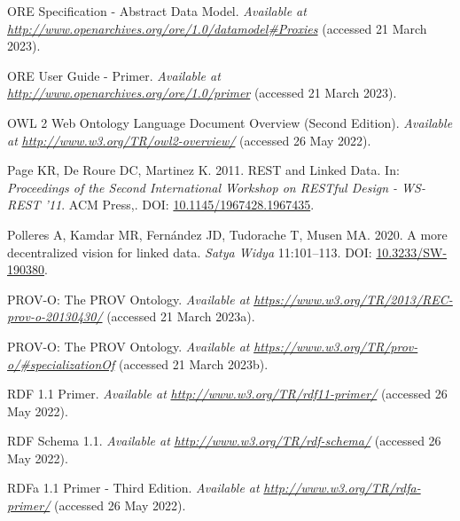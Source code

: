\begin{CSLReferences}{1}{0}
\leavevmode{}%
ORE Specification - Abstract Data Model. \emph{Available at} \href{http://www.openarchives.org/ore/1.0/datamodel\#Proxies}{\emph{http://www.openarchives.org/ore/1.0/datamodel\#Proxies}} (accessed 21 March 2023).

\leavevmode{}%
ORE User Guide - Primer. \emph{Available at} \href{http://www.openarchives.org/ore/1.0/primer}{\emph{http://www.openarchives.org/ore/1.0/primer}} (accessed 21 March 2023).

\leavevmode{}%
OWL 2 Web Ontology Language Document Overview (Second Edition). \emph{Available at} \href{http://www.w3.org/TR/owl2-overview/}{\emph{http://www.w3.org/TR/owl2-overview/}} (accessed 26 May 2022).

\leavevmode{}%
Page KR, De Roure DC, Martinez K. 2011. REST and Linked Data. In: \emph{Proceedings of the Second International Workshop on RESTful Design - WS-REST '11}. ACM Press,. DOI: \href{https://doi.org/10.1145/1967428.1967435}{10.1145/1967428.1967435}.

\leavevmode{}%
Polleres A, Kamdar MR, Fernández JD, Tudorache T, Musen MA. 2020. A more decentralized vision for linked data. \emph{Satya Widya} 11:101--113. DOI: \href{https://doi.org/10.3233/SW-190380}{10.3233/SW-190380}.

\leavevmode{}%
PROV-O: The PROV Ontology. \emph{Available at} \href{https://www.w3.org/TR/2013/REC-prov-o-20130430/}{\emph{https://www.w3.org/TR/2013/REC-prov-o-20130430/}} (accessed 21 March 2023a).

\leavevmode{}%
PROV-O: The PROV Ontology. \emph{Available at} \href{https://www.w3.org/TR/prov-o/\#specializationOf}{\emph{https://www.w3.org/TR/prov-o/\#specializationOf}} (accessed 21 March 2023b).

\leavevmode{}%
RDF 1.1 Primer. \emph{Available at} \href{http://www.w3.org/TR/rdf11-primer/}{\emph{http://www.w3.org/TR/rdf11-primer/}} (accessed 26 May 2022).

\leavevmode{}%
RDF Schema 1.1. \emph{Available at} \href{http://www.w3.org/TR/rdf-schema/}{\emph{http://www.w3.org/TR/rdf-schema/}} (accessed 26 May 2022).

\leavevmode{}%
RDFa 1.1 Primer - Third Edition. \emph{Available at} \href{http://www.w3.org/TR/rdfa-primer/}{\emph{http://www.w3.org/TR/rdfa-primer/}} (accessed 26 May 2022).


\end{CSLReferences}
